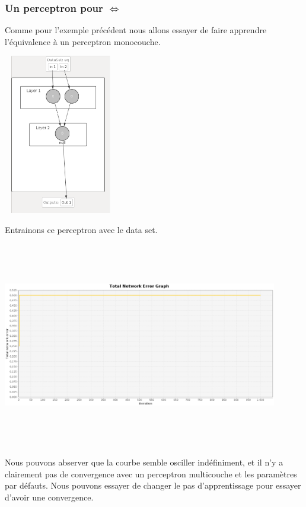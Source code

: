 \documentclass[twoside,openright,a4paper,11pt,french]{article}
\begin{document}
\subsubsection{Un perceptron pour $\Leftrightarrow$}

Comme pour l'exemple précédent nous allons essayer de faire apprendre
l'équivalence à un perceptron monocouche.

\includegraphics[width=5cm,height=7cm]{./pics/eq/perceptron_mono.eps}

Entrainons ce perceptron avec le data set.

\includegraphics[width=12cm,height=9cm]{./pics/eq/mono_eq_def.eps}

Nous pouvons abserver que la courbe semble osciller indéfiniment,
et il n'y a clairement pas de convergence avec un perceptron multicouche
et les paramètres par défauts.
Nous pouvons essayer de changer le pas d'apprentissage pour essayer d'avoir
une convergence.
\end{document}
